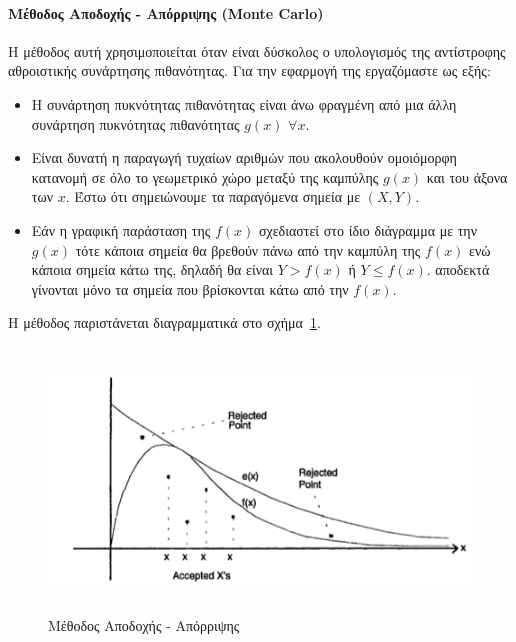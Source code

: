 \documentclass[12pt]{report}
\begin{document}
\paragraph{Μέθοδος Αποδοχής - Απόρριψης (\textlatin{Monte Carlo})}
Η μέθοδος αυτή χρησιμοποιείται όταν είναι δύσκολος ο υπολογισμός της αντίστροφης αθροιστικής συνάρτησης πιθανότητας. Για την εφαρμογή της εργαζόμαστε ως εξής:
\begin{itemize}
  \item Η συνάρτηση πυκνότητας πιθανότητας είναι άνω φραγμένη από μια άλλη συνάρτηση πυκνότητας πιθανότητας \(g(x)\) \(\forall x\).
  \item Είναι δυνατή η παραγωγή τυχαίων αριθμών που ακολουθούν ομοιόμορφη κατανομή σε όλο το γεωμετρικό χώρο μεταξύ της καμπύλης \(g(x)\) και του άξονα των \(x\). Έστω ότι σημειώνουμε τα παραγόμενα σημεία με \((X, Y)\).
  \item Εάν η γραφική παράσταση της \(f(x)\) σχεδιαστεί στο ίδιο διάγραμμα με την \(g(x)\) τότε κάποια σημεία θα βρεθούν πάνω από την καμπύλη της \(f(x)\) ενώ κάποια σημεία κάτω της, δηλαδή θα είναι \(Y>f(x)\) ή \(Y \leq f(x)\). αποδεκτά γίνονται μόνο τα σημεία που βρίσκονται κάτω από την \(f(x)\).
\end{itemize}
Η μέθοδος παριστάνεται διαγραμματικά στο σχήμα~\ref{fig:acc_rej_method}.
\begin{figure}[h]
\includegraphics[width=0.9\linewidth, height=7cm]{acc_rej_method} 
\caption{Μέθοδος Αποδοχής - Απόρριψης}
\label{fig:acc_rej_method}
\end{figure}
\end{document}
